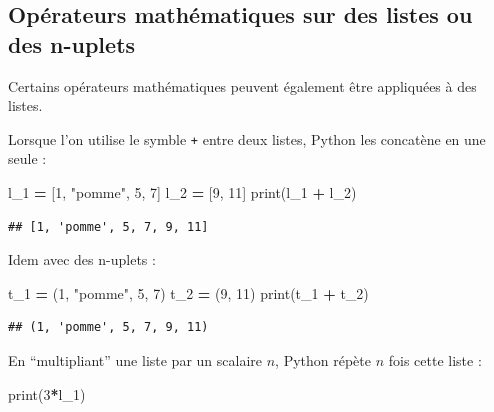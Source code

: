 \documentclass[12pt,]{book}
\newenvironment{Shaded}{\begin{snugshade}}{\end{snugshade}}
\newcommand{\DecValTok}[1]{\textcolor[rgb]{0.00,0.00,0.81}{#1}}
\newcommand{\StringTok}[1]{\textcolor[rgb]{0.31,0.60,0.02}{#1}}
\newcommand{\OperatorTok}[1]{\textcolor[rgb]{0.81,0.36,0.00}{\textbf{#1}}}
\newcommand{\BuiltInTok}[1]{#1}
\newcommand{\NormalTok}[1]{#1}
\numberwithin{equation}{section}
\numberwithin{countremarque}{section}
\begin{document}
\subsection{Opérateurs mathématiques sur des listes ou des
n-uplets}\label{operateurs-mathematiques-sur-des-listes-ou-des-n-uplets}

Certains opérateurs mathématiques peuvent également être appliquées à
des listes.

Lorsque l'on utilise le symble \texttt{+} entre deux listes, Python les
concatène en une seule :

\begin{Shaded}
\begin{Highlighting}[]
\NormalTok{l_1 }\OperatorTok{=}\NormalTok{ [}\DecValTok{1}\NormalTok{, }\StringTok{"pomme"}\NormalTok{, }\DecValTok{5}\NormalTok{, }\DecValTok{7}\NormalTok{]}
\NormalTok{l_2 }\OperatorTok{=}\NormalTok{ [}\DecValTok{9}\NormalTok{, }\DecValTok{11}\NormalTok{]}
\BuiltInTok{print}\NormalTok{(l_1 }\OperatorTok{+}\NormalTok{ l_2)}
\end{Highlighting}
\end{Shaded}

\begin{lstlisting}
## [1, 'pomme', 5, 7, 9, 11]
\end{lstlisting}

Idem avec des n-uplets :

\begin{Shaded}
\begin{Highlighting}[]
\NormalTok{t_1 }\OperatorTok{=}\NormalTok{ (}\DecValTok{1}\NormalTok{, }\StringTok{"pomme"}\NormalTok{, }\DecValTok{5}\NormalTok{, }\DecValTok{7}\NormalTok{)}
\NormalTok{t_2 }\OperatorTok{=}\NormalTok{ (}\DecValTok{9}\NormalTok{, }\DecValTok{11}\NormalTok{)}
\BuiltInTok{print}\NormalTok{(t_1 }\OperatorTok{+}\NormalTok{ t_2)}
\end{Highlighting}
\end{Shaded}

\begin{lstlisting}
## (1, 'pomme', 5, 7, 9, 11)
\end{lstlisting}

En ``multipliant'' une liste par un scalaire \(n\), Python répète \(n\)
fois cette liste :

\begin{Shaded}
\begin{Highlighting}[]
\BuiltInTok{print}\NormalTok{(}\DecValTok{3}\OperatorTok{*}\NormalTok{l_1)}
\end{Highlighting}
\end{Shaded}
\end{document}
